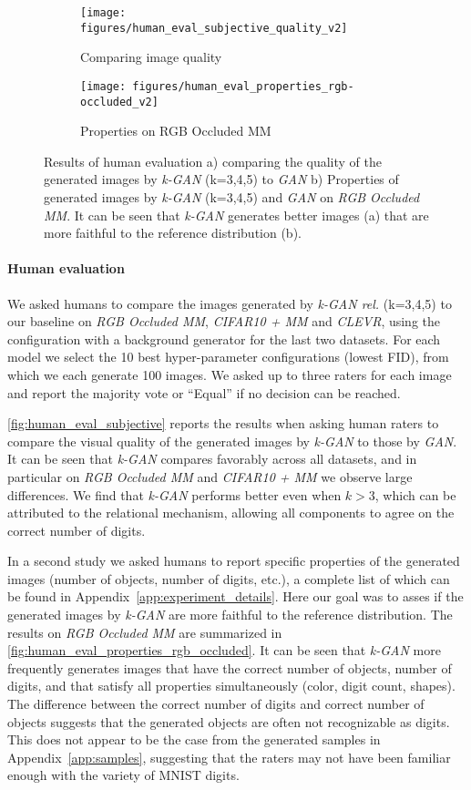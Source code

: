 \documentclass{article}
\begin{document}
\begin{figure}
\begin{subfigure}{.5\textwidth}
  \centering
  \texttt{[image: figures/human\_eval\_subjective\_quality\_v2]}
  \caption{Comparing image quality}
  \label{fig:human_eval_subjective}
\end{subfigure}%
\begin{subfigure}{0.5\textwidth}
  \centering
  \texttt{[image: figures/human\_eval\_properties\_rgb-occluded\_v2]}
  \caption{Properties on RGB Occluded MM}
  \label{fig:human_eval_properties_rgb_occluded}
\end{subfigure}
\caption{Results of human evaluation a) comparing the quality of the generated images by \emph{k-GAN} (k=3,4,5) to \emph{GAN} b) Properties of generated images by \emph{k-GAN} (k=3,4,5) and \emph{GAN} on \emph{RGB Occluded MM}. It can be seen that \emph{k-GAN} generates better images (a) that are more faithful to the reference distribution (b).}
\end{figure}\paragraph{Human evaluation}
We asked humans to compare the images generated by \emph{k-GAN rel.} (k=3,4,5) to our baseline on \emph{RGB Occluded MM}, \emph{CIFAR10 + MM} and \emph{CLEVR}, using the configuration with a background generator for the last two datasets.
For each model we select the 10 best hyper-parameter configurations (lowest FID), from which we each generate 100 images.
We asked up to three raters for each image and report the majority vote or ``Equal'' if no decision can be reached.

\autoref{fig:human_eval_subjective} reports the results when asking human raters to compare the visual quality of the generated images by \emph{k-GAN} to those by \emph{GAN}.
It can be seen that \emph{k-GAN} compares favorably across all datasets, and in particular on \emph{RGB Occluded MM} and \emph{CIFAR10 + MM} we observe large differences.
We find that \emph{k-GAN} performs better even when $k>3$, which can be attributed to the relational mechanism, allowing all components to agree on the correct number of digits.


In a second study we asked humans to report specific properties of the generated images (number of objects, number of digits, etc.),
a complete list of which can be found in Appendix~\ref{app:experiment_details}.
Here our goal was to asses if the generated images by \emph{k-GAN} are more faithful to the reference distribution.
The results on \emph{RGB Occluded MM} are summarized in \autoref{fig:human_eval_properties_rgb_occluded}.
It can be seen that \emph{k-GAN} more frequently generates images that have the correct number of objects, number of digits, and that satisfy all properties simultaneously (color, digit count, shapes).
The difference between the correct number of digits and correct number of objects suggests that the generated objects are often not recognizable as digits.
This does not appear to be the case from the generated samples in Appendix~\ref{app:samples}, suggesting that the raters may not have been familiar enough with the variety of MNIST digits.
\end{document}
